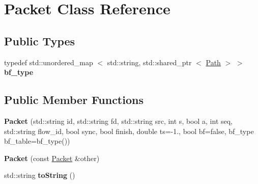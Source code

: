 \hypertarget{classPacket}{\section{\-Packet \-Class \-Reference}
\label{classPacket}
}
\subsection*{\-Public \-Types}
\begin{DoxyCompactItemize}
\item 
\hypertarget{classPacket_a4cae1612a245ea2eadde0066ecc4b990}{typedef std\-::unordered\-\_\-map\*
$<$ std\-::string, std\-::shared\-\_\-ptr\*
$<$ \hyperlink{classPath}{\-Path} $>$ $>$ {\bfseries bf\-\_\-type}}\label{classPacket_a4cae1612a245ea2eadde0066ecc4b990}

\end{DoxyCompactItemize}
\subsection*{\-Public \-Member \-Functions}
\begin{DoxyCompactItemize}
\item 
\hypertarget{classPacket_a0467ca3fb88b9a8a6a41182aed61e5b3}{{\bfseries \-Packet} (std\-::string id, std\-::string fd, std\-::string src, int s, bool a, int seq, std\-::string flow\-\_\-id, bool sync, bool finish, double ts=-\/1., bool bf=false, bf\-\_\-type bf\-\_\-table=bf\-\_\-type())}\label{classPacket_a0467ca3fb88b9a8a6a41182aed61e5b3}

\item 
\hypertarget{classPacket_ae8d5dfea51fa7fe55e4705b176f326ec}{{\bfseries \-Packet} (const \hyperlink{classPacket}{\-Packet} \&other)}\label{classPacket_ae8d5dfea51fa7fe55e4705b176f326ec}

\item 
\hypertarget{classPacket_aa4f4ad4075cad5a29af1646c3e289399}{std\-::string {\bfseries to\-String} ()}\label{classPacket_aa4f4ad4075cad5a29af1646c3e289399}

\end{DoxyCompactItemize}
